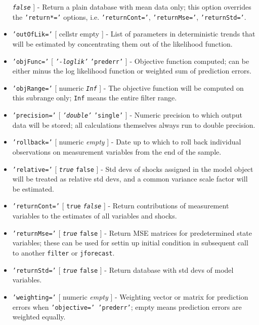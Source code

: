 \begin{itemize}
  \emph{\texttt{false}} {]} - Return a plain database with mean data
  only; this option overrides the \texttt{'return*='} options, i.e.
  \texttt{'returnCont='}, \texttt{'returnMse='}, \texttt{'returnStd='}.
\item
  \texttt{'outOfLik='} {[} cellstr \textbar{} empty {]} - List of
  parameters in deterministic trends that will be estimated by
  concentrating them out of the likelihood function.
\item
  \texttt{'objFunc='} {[} \emph{\texttt{'-loglik'}} \textbar{}
  \texttt{'prederr'} {]} - Objective function computed; can be either
  minus the log likelihood function or weighted sum of prediction
  errors.
\item
  \texttt{'objRange='} {[} numeric \textbar{} \emph{\texttt{Inf}} {]} -
  The objective function will be computed on this subrange only;
  \texttt{Inf} means the entire filter range.
\item
  \texttt{'precision='} {[} \emph{\texttt{'double'}} \textbar{}
  \texttt{'single'} {]} - Numeric precision to which output data will be
  stored; all calculations themselves always run to double precision.
\item
  \texttt{'rollback='} {[} numeric \textbar{} \emph{empty} {]} - Date up
  to which to roll back individual observations on measurement variables
  from the end of the sample.
\item
  \texttt{'relative='} {[} \emph{\texttt{true}} \textbar{}
  \texttt{false} {]} - Std devs of shocks assigned in the model object
  will be treated as relative std devs, and a common variance scale
  factor will be estimated.
\item
  \texttt{'returnCont='} {[} \texttt{true} \textbar{}
  \emph{\texttt{false}} {]} - Return contributions of measurement
  variables to the estimates of all variables and shocks.
\item
  \texttt{'returnMse='} {[} \emph{\texttt{true}} \textbar{}
  \texttt{false} {]} - Return MSE matrices for predetermined state
  variables; these can be used for settin up initial condition in
  subsequent call to another \texttt{filter} or \texttt{jforecast}.
\item
  \texttt{'returnStd='} {[} \emph{\texttt{true}} \textbar{}
  \texttt{false} {]} - Return database with std devs of model variables.
\item
  \texttt{'weighting='} {[} numeric \textbar{} \emph{empty} {]} -
  Weighting vector or matrix for prediction errors when
  \texttt{'objective=' 'prederr'}; empty means prediction errors are
  weighted equally.
\end{itemize}

